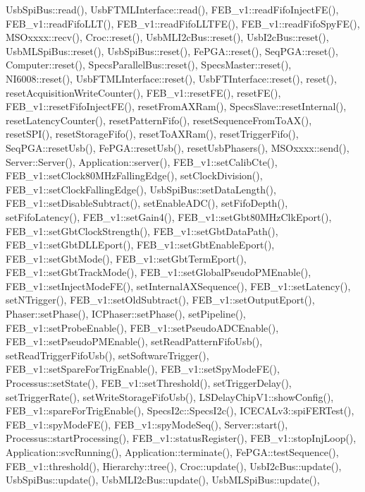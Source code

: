 Usb\+Spi\+Bus\+::read(), Usb\+F\+T\+M\+L\+Interface\+::read(), F\+E\+B\+\_\+v1\+::read\+Fifo\+Inject\+F\+E(), F\+E\+B\+\_\+v1\+::read\+Fifo\+L\+L\+T(), F\+E\+B\+\_\+v1\+::read\+Fifo\+L\+L\+T\+F\+E(), F\+E\+B\+\_\+v1\+::read\+Fifo\+Spy\+F\+E(), M\+S\+Oxxxx\+::recv(), Croc\+::reset(), Usb\+M\+L\+I2c\+Bus\+::reset(), Usb\+I2c\+Bus\+::reset(), Usb\+M\+L\+Spi\+Bus\+::reset(), Usb\+Spi\+Bus\+::reset(), Fe\+P\+G\+A\+::reset(), Seq\+P\+G\+A\+::reset(), Computer\+::reset(), Specs\+Parallel\+Bus\+::reset(), Specs\+Master\+::reset(), N\+I6008\+::reset(), Usb\+F\+T\+M\+L\+Interface\+::reset(), Usb\+F\+T\+Interface\+::reset(), reset(), reset\+Acquisition\+Write\+Counter(), F\+E\+B\+\_\+v1\+::reset\+F\+E(), reset\+F\+E(), F\+E\+B\+\_\+v1\+::reset\+Fifo\+Inject\+F\+E(), reset\+From\+A\+X\+Ram(), Specs\+Slave\+::reset\+Internal(), reset\+Latency\+Counter(), reset\+Pattern\+Fifo(), reset\+Sequence\+From\+To\+A\+X(), reset\+S\+P\+I(), reset\+Storage\+Fifo(), reset\+To\+A\+X\+Ram(), reset\+Trigger\+Fifo(), Seq\+P\+G\+A\+::reset\+Usb(), Fe\+P\+G\+A\+::reset\+Usb(), reset\+Usb\+Phasers(), M\+S\+Oxxxx\+::send(), Server\+::\+Server(), Application\+::server(), F\+E\+B\+\_\+v1\+::set\+Calib\+Cte(), F\+E\+B\+\_\+v1\+::set\+Clock80\+M\+Hz\+Falling\+Edge(), set\+Clock\+Division(), F\+E\+B\+\_\+v1\+::set\+Clock\+Falling\+Edge(), Usb\+Spi\+Bus\+::set\+Data\+Length(), F\+E\+B\+\_\+v1\+::set\+Disable\+Subtract(), set\+Enable\+A\+D\+C(), set\+Fifo\+Depth(), set\+Fifo\+Latency(), F\+E\+B\+\_\+v1\+::set\+Gain4(), F\+E\+B\+\_\+v1\+::set\+Gbt80\+M\+Hz\+Clk\+Eport(), F\+E\+B\+\_\+v1\+::set\+Gbt\+Clock\+Strength(), F\+E\+B\+\_\+v1\+::set\+Gbt\+Data\+Path(), F\+E\+B\+\_\+v1\+::set\+Gbt\+D\+L\+L\+Eport(), F\+E\+B\+\_\+v1\+::set\+Gbt\+Enable\+Eport(), F\+E\+B\+\_\+v1\+::set\+Gbt\+Mode(), F\+E\+B\+\_\+v1\+::set\+Gbt\+Term\+Eport(), F\+E\+B\+\_\+v1\+::set\+Gbt\+Track\+Mode(), F\+E\+B\+\_\+v1\+::set\+Global\+Pseudo\+P\+M\+Enable(), F\+E\+B\+\_\+v1\+::set\+Inject\+Mode\+F\+E(), set\+Internal\+A\+X\+Sequence(), F\+E\+B\+\_\+v1\+::set\+Latency(), set\+N\+Trigger(), F\+E\+B\+\_\+v1\+::set\+Old\+Subtract(), F\+E\+B\+\_\+v1\+::set\+Output\+Eport(), Phaser\+::set\+Phase(), I\+C\+Phaser\+::set\+Phase(), set\+Pipeline(), F\+E\+B\+\_\+v1\+::set\+Probe\+Enable(), F\+E\+B\+\_\+v1\+::set\+Pseudo\+A\+D\+C\+Enable(), F\+E\+B\+\_\+v1\+::set\+Pseudo\+P\+M\+Enable(), set\+Read\+Pattern\+Fifo\+Usb(), set\+Read\+Trigger\+Fifo\+Usb(), set\+Software\+Trigger(), F\+E\+B\+\_\+v1\+::set\+Spare\+For\+Trig\+Enable(), F\+E\+B\+\_\+v1\+::set\+Spy\+Mode\+F\+E(), Processus\+::set\+State(), F\+E\+B\+\_\+v1\+::set\+Threshold(), set\+Trigger\+Delay(), set\+Trigger\+Rate(), set\+Write\+Storage\+Fifo\+Usb(), L\+S\+Delay\+Chip\+V1\+::show\+Config(), F\+E\+B\+\_\+v1\+::spare\+For\+Trig\+Enable(), Specs\+I2c\+::\+Specs\+I2c(), I\+C\+E\+C\+A\+Lv3\+::spi\+F\+E\+R\+Test(), F\+E\+B\+\_\+v1\+::spy\+Mode\+F\+E(), F\+E\+B\+\_\+v1\+::spy\+Mode\+Seq(), Server\+::start(), Processus\+::start\+Processing(), F\+E\+B\+\_\+v1\+::status\+Register(), F\+E\+B\+\_\+v1\+::stop\+Inj\+Loop(), Application\+::svc\+Running(), Application\+::terminate(), Fe\+P\+G\+A\+::test\+Sequence(), F\+E\+B\+\_\+v1\+::threshold(), Hierarchy\+::tree(), Croc\+::update(), Usb\+I2c\+Bus\+::update(), Usb\+Spi\+Bus\+::update(), Usb\+M\+L\+I2c\+Bus\+::update(), Usb\+M\+L\+Spi\+Bus\+::update(), 